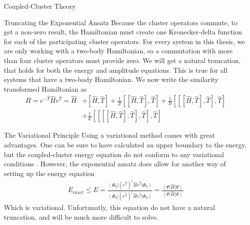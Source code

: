 \documentclass[twoside,english]{uiofysmaster}
\begin{document}
\begin{chapter}{Coupled-Cluster Theory}
\begin{section}{Truncating the Exponential Ansatz}
	  	Because the cluster operators commute, to get a non-zero result, the Hamiltonian must create one Kronecker-delta function for each of the participating cluster operators. For every system in this thesis, we are only working with a two-body Hamiltonian, so a commutation with more than four cluster operators must provide zero. We will get a natural truncation, that holds for both the energy and amplitude equations. This is true for all systems that have a two-body Hamiltonian. We now write the similarity transformed Hamiltonian as
	  	\begin{align}
	  		\overline H = e^{-\hat T} \hat H e^{\hat T} = \hat H &+ [ \hat H, \hat T] + \frac{1}{2!} [[\hat H, \hat T], \hat T] + \frac{1}{3!} [[[ \hat H, \hat T ], \hat T ], \hat T ] \\  &+ \frac{1}{4!} [[[[\hat H, \hat T], \hat T], \hat T], \hat T] \nonumber
	  	\end{align}

	\end{section}  	

	\begin{section}{The Variational Principle}
		Using a variational method comes with great advantages. One can be sure to have calculated an upper boundary to the energy, but the coupled-cluster energy equation do not conform to any variational conditions \cite{Crawford}. However, the exponential ansatz does allow for another way of setting up the energy equation
		\begin{align}
			E_{\text{exact}} \leq E = \frac{\left< \Phi_0 \right| (e^{\hat T})^\dagger \hat H e^{\hat T} \left| \Phi_0 \right>}{\left< \Phi_0 \right| (e^{\hat T})^\dagger \hat H e^{\hat T} \left| \Phi_0 \right>} = \frac{\left< \Psi \right| \hat H \left| \Psi \right>}{\left< \Psi \right| \hat H \left| \Psi \right>}
		\end{align}
		Which is variational. Unfortunatly, this equation do not have a natural truncation, and will be much more difficult to solve. 
	\end{section}


\end{chapter}
\end{document}
